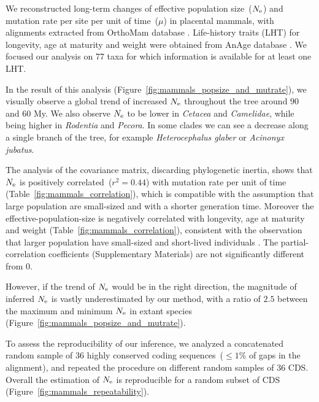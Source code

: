 We reconstructed long-term changes of effective population size~($N_{\mathrm{e}}$) and mutation rate per site per unit of time~($\mu$) in placental mammals, with alignments extracted from OrthoMam database \citep{Ranwez2007,Scornavacca2019}.
Life-history traits (LHT) for longevity, age at maturity and weight were obtained from AnAge database \citep{DEMAGALHAES2009,Tacutu2012}.
We focused our analysis on 77 taxa for which information is available for at least one LHT.

In the result of this analysis (Figure~\ref{fig:mammals_popsize_and_mutrate}), we visually observe a global trend of increased $N_{\mathrm{e}}$ throughout the tree around $90$ and $60$ My.
We also observe $N_{\mathrm{e}}$ to be lower in \textit{Cetacea} and \textit{Camelidae}, while being higher in \textit{Rodentia} and \textit{Pecora}.
In some clades we can see a decrease along a single branch of the tree, for example \textit{Heterocephalus glaber} or \textit{Acinonyx jubatus}.

The analysis of the covariance matrix, discarding phylogenetic inertia, shows that $N_{\mathrm{e}}$ is positively correlated~($r^2 = 0.44$) with mutation rate per unit of time (Table~\ref{fig:mammals_correlation}), which is compatible with the assumption that large population are small-sized and with a shorter generation time.
Moreover the \gls{effective-population-size} is negatively correlated with longevity, age at maturity and weight (Table~\ref{fig:mammals_correlation}), consistent with the observation that larger population have small-sized and short-lived individuals \citep{Galtier2016,Romiguier2014}.
The partial-correlation coefficients (Supplementary Materials) are not significantly different from $0$.

However, if the trend of $N_{\mathrm{e}}$ would be in the right direction, the magnitude of inferred $N_{\mathrm{e}}$ is vastly underestimated by our method, with a ratio of $2.5$ between the maximum and minimum $N_{\mathrm{e}}$ in extant species (Figure~\ref{fig:mammals_popsize_and_mutrate}).

To assess the reproducibility of our inference, we analyzed a concatenated random sample of 36 highly conserved coding sequences~($\leq 1\%$ of gaps in the alignment), and repeated the procedure on different random samples of 36 CDS.
Overall the estimation of $N_{\mathrm{e}}$ is reproducible for a random subset of CDS (Figure~\ref{fig:mammals_repeatability}).


